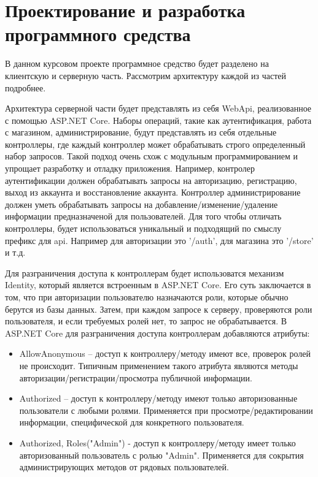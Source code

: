 \section{Проектирование и разработка программного средства} 
\label{sec:development}

В данном курсовом проекте программное средство будет разделено на клиентскую и серверную часть. Рассмотрим архитектуру каждой из частей подробнее.

Архитектура серверной части будет представлять из себя WebApi, реализованное с помощью ASP.NET Core. Наборы операций, такие как аутентификация, работа с магазином, администрирование, будут представлять из себя отдельные контроллеры, где каждый контроллер может обрабатывать строго определенный набор запросов.
Такой подход очень схож с модульным программированием и упрощает разработку и отладку приложения. Например, контролер аутентификации должен обрабатывать запросы на авторизацию, регистрацию, выход из аккаунта и восстановление аккаунта.
Контроллер администрирование должен уметь обрабатывать запросы на добавление/изменение/удаление информации предназначеной для пользователей. Для того чтобы отличать контроллеры, будет использоваться уникальный и подходящий по смыслу префикс для api.
Например для авторизации это '/auth', для магазина это '/store' и т.д. 

Для разграничения доступа к контроллерам будет использоватся механизм Identity, который является встроенным в ASP.NET Core. Его суть заключается в том, что при авторизации пользователю назначаются роли, 
которые обычно берутся из базы данных. Затем, при каждом запросе к серверу, проверяются роли пользователя, и если требуемых ролей нет, то запрос не обрабатывается. 
В ASP.NET Core для разграничения доступа контроллерам добавляются атрибуты: 
\begin{itemize}
	\item AllowAnonymous -- доступ к контроллеру/методу имеют все, проверок ролей не происходит. Типичным применением такого атрибута являются методы авторизации/регистрации/просмотра публичной информации.
	\item Authorized -- доступ к контроллеру/методу имеют только авторизованные пользователи с любыми ролями. Применяется при просмотре/редактировании информации, специфической для конкретного пользователя.
	\item Authorized, Roles("Admin") - доступ к контроллеру/методу имеет только авторизованный пользователь с ролью "Admin". Применяется для сокрытия администрирующих методов от рядовых пользователей. 
\end{itemize} 

